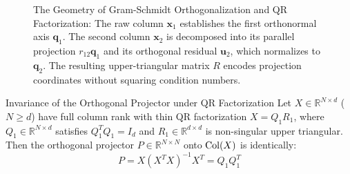 \begin{figure}[htbp]
\caption{The Geometry of Gram-Schmidt Orthogonalization and QR Factorization: The raw column $\mathbf{x}_1$ establishes the first orthonormal axis $\mathbf{q}_1$. The second column $\mathbf{x}_2$ is decomposed into its parallel projection $r_{12}\mathbf{q}_1$ and its orthogonal residual $\mathbf{u}_2$, which normalizes to $\mathbf{q}_2$. The resulting upper-triangular matrix $R$ encodes projection coordinates without squaring condition numbers.}
\label{fig:qr_gram_schmidt_geometry}
\end{figure}

\begin{theorembox}{Invariance of the Orthogonal Projector under QR Factorization}
\label{thm:qr_proj_invariance}
Let $X \in \mathbb{R}^{N \times d}$ ($N \ge d$) have full column rank with thin QR factorization $X = Q_1 R_1$, where $Q_1 \in \mathbb{R}^{N \times d}$ satisfies $Q_1^T Q_1 = I_d$ and $R_1 \in \mathbb{R}^{d \times d}$ is non-singular upper triangular. Then the orthogonal projector $P \in \mathbb{R}^{N \times N}$ onto $\operatorname{Col}(X)$ is identically:
\begin{equation}
P = X(X^T X)^{-1} X^T = Q_1 Q_1^T
\label{eq:qr_proj_identity}
\end{equation}
\end{theorembox}

